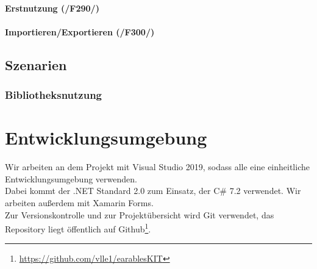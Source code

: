 \documentclass[a4paper,12pt]{article}
\begin{document}
  \paragraph{Erstnutzung (/F290/)}

  \paragraph{Importieren/Exportieren (/F300/)}


  \subsection{Szenarien}
    \subsubsection{Bibliotheksnutzung}


\section{Entwicklungsumgebung}
Wir arbeiten an dem Projekt mit Visual Studio 2019, sodass alle eine einheitliche Entwicklungsumgebung verwenden.\\
Dabei kommt der .NET Standard 2.0 zum Einsatz, der C\# 7.2 verwendet. Wir arbeiten außerdem mit Xamarin Forms.\\
Zur Versionskontrolle und zur Projektübersicht wird Git verwendet, das Repository liegt öffentlich auf Github\footnote{\url{https://github.com/vlle1/earablesKIT}}.
\clearpage
\printglossaries
{}
\end{document}
